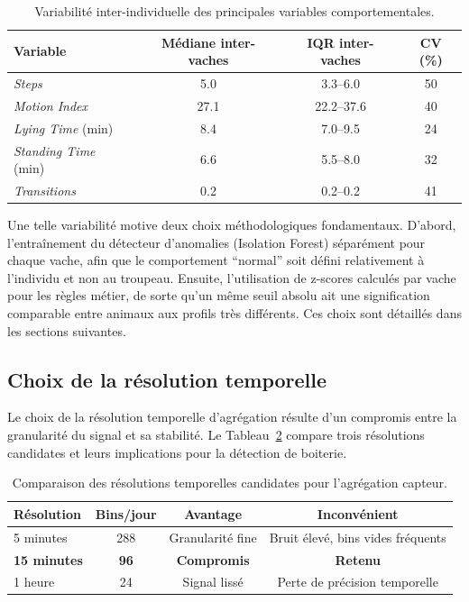 \begin{table}[H]
    \centering
    \caption{Variabilité inter-individuelle des principales variables comportementales.}
    \label{tab:variabilite_inter}
    \begin{tabular}{lccc}
        \toprule
        \textbf{Variable} & \textbf{Médiane inter-vaches}
        & \textbf{IQR inter-vaches} & \textbf{CV (\%)} \\
        \midrule
        \textit{Steps}              & 5.0          & 3.3--6.0       & 50 \\
        \textit{Motion Index}       & 27.1         & 22.2--37.6     & 40 \\
        \textit{Lying Time} (min)   & 8.4          & 7.0--9.5       & 24 \\
        \textit{Standing Time} (min)& 6.6          & 5.5--8.0       & 32 \\
        \textit{Transitions}        & 0.2          & 0.2--0.2       & 41 \\
        \bottomrule
    \end{tabular}
\end{table}

Une telle variabilité motive deux choix méthodologiques fondamentaux. D'abord,
l'entraînement du détecteur d'anomalies (Isolation Forest) séparément pour chaque vache,
afin que le comportement ``normal'' soit défini relativement à l'individu et non au
troupeau. Ensuite, l'utilisation de z-scores calculés par vache pour les règles métier,
de sorte qu'un même seuil absolu ait une signification comparable entre animaux aux
profils très différents. Ces choix sont détaillés dans les sections suivantes.

\subsection{Choix de la résolution temporelle}

Le choix de la résolution temporelle d'agrégation résulte d'un compromis entre la
granularité du signal et sa stabilité. Le Tableau~\ref{tab:choix_resolution} compare trois
résolutions candidates et leurs implications pour la détection de boiterie.

\begin{table}[H]
    \centering
    \caption{Comparaison des résolutions temporelles candidates pour l'agrégation capteur.}
    \label{tab:choix_resolution}
    \begin{tabular}{lccc}
        \toprule
        \textbf{Résolution} & \textbf{Bins/jour} & \textbf{Avantage} & \textbf{Inconvénient} \\
        \midrule
        5 minutes & 288 & Granularité fine & Bruit élevé, bins vides fréquents \\
        \textbf{15 minutes} & \textbf{96} & \textbf{Compromis} & \textbf{Retenu} \\
        1 heure & 24 & Signal lissé & Perte de précision temporelle \\
        \bottomrule
    \end{tabular}
\end{table}

